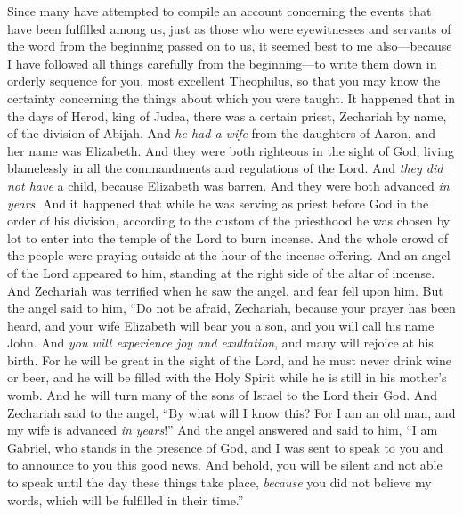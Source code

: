 
\begin{biblechapter} %
 Since many have attempted to compile an account concerning the events that have been fulfilled among us,
\verse just as those who were eyewitnesses and servants of the word from the beginning passed on to us,
\verse it seemed best to me also—because I have followed all things carefully from the beginning—to write them down in orderly sequence for you, most excellent Theophilus,
\verse so that you may know the certainty concerning the things about which you were taught.
 It happened that in the days of Herod, king of Judea, there was a certain priest, Zechariah by name, of the division of Abijah. And \textit{he had a wife} from the daughters of Aaron, and her name was Elizabeth.
\verse And they were both righteous in the sight of God, living blamelessly in all the commandments and regulations of the Lord.
\verse And \textit{they did not have} a child, because Elizabeth was barren. And they were both advanced \textit{in years}.
\verse And it happened that while he was serving as priest before God in the order of his division,
\verse according to the custom of the priesthood he was chosen by lot to enter into the temple of the Lord to burn incense.
\verse And the whole crowd of the people were praying outside at the hour of the incense offering.
\verse And an angel of the Lord appeared to him, standing at the right side of the altar of incense.
\verse And Zechariah was terrified when he saw the angel, and fear fell upon him.
\verse But the angel said to him,
\verse “Do not be afraid, Zechariah, 
because your prayer has been heard, 
and your wife Elizabeth will bear you a son, 
and you will call his name John.
\verse And \textit{you will experience joy and exultation}, 
and many will rejoice at his birth.
\verse For he will be great in the sight of the Lord, 
and he must never drink wine or beer, 
and he will be filled with the Holy Spirit 
while he is still in his mother’s womb.
\verse And he will turn many of the sons of Israel 
to the Lord their God.
\verse And Zechariah said to the angel, “By what will I know this? For I am an old man, and my wife is advanced \textit{in years}!”
\verse And the angel answered and said to him, “I am Gabriel, who stands in the presence of God, and I was sent to speak to you and to announce to you this good news.
\verse And behold, you will be silent and not able to speak until the day these things take place, \textit{because} you did not believe my words, which will be fulfilled in their time.”

\end{biblechapter}

